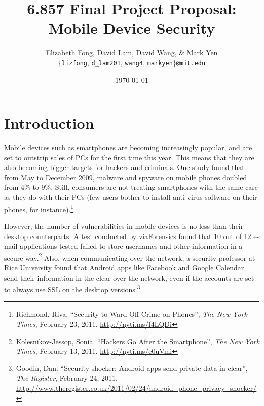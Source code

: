 \documentclass[11pt]{article}
\begin{document}
\title{6.857 Final Project Proposal: Mobile Device Security}
\author{Elizabeth Fong, David Lam, David Wang, \& Mark Yen\\
\{\href{mailto:lizfong@mit.edu}{\texttt{lizfong}},
\href{mailto:d_lam201@mit.edu}{\texttt{d\_lam201}},
\href{mailto:wang4@mit.edu}{\texttt{wang4}},
\href{mailto:markyen@mit.edu}{\texttt{markyen}}\}\texttt{@mit.edu}}
\date{\today}
\maketitle

\section{Introduction}
Mobile devices such as smartphones are becoming increasingly popular, and are
set to outstrip sales of PCs for the first time this year. This means that they
are also becoming bigger targets for hackers and criminals. One study found
that from May to December 2009, malware and spyware on mobile phones doubled
from 4\% to 9\%. Still, consumers are not treating smartphones with the same
care as they do with their PCs (few users bother to install anti-virus software
on their phones, for instance).\footnote{Richmond, Riva. ``Security to Ward Off
Crime on Phones'', \textit{The New York Times}, February 23, 2011.
\url{http://nyti.ms/f4LQDi}}

However, the number of vulnerabilities in mobile devices is no less than their
desktop counterparts. A test conducted by viaForensics found that 10 out of 12
e-mail applications tested failed to store usernames and other information in a
secure way.\footnote{Kolesnikov-Jessop, Sonia. ``Hackers Go After the
Smartphone'', \textit{The New York Times}, February 13, 2011.
\url{http://nyti.ms/e0uVmi}} Also, when communicating over the network, a
security professor at Rice University found that Android apps like Facebook and
Google Calendar send their information in the clear over the network, even if
the accounts are set to always use SSL on the desktop
versions.\footnote{Goodin, Dan. ``Security shocker: Android apps send private
data in clear'', \textit{The Register}, February 24, 2011.
\url{http://www.theregister.co.uk/2011/02/24/android_phone_privacy_shocker/}}
\end{document}
